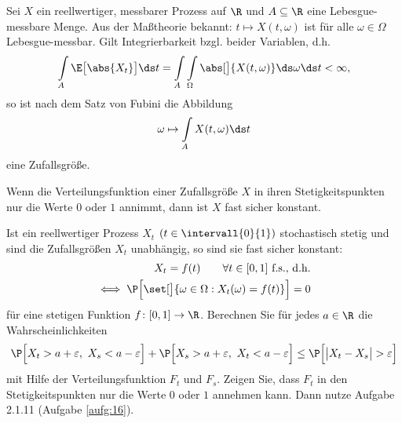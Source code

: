 \begin{bemerkungnr}\label{bemerkung2.1.10}
	Sei $X$ ein reellwertiger, messbarer Prozess auf $\R$ und $A\subseteq\R$ eine Lebesgue-messbare Menge.
	Aus der Maßtheorie bekannt:
	$t\mapsto X(t,\omega)$ ist für alle $\omega\in\Omega$ Lebesgue-messbar.
	Gilt Integrierbarkeit bzgl. beider Variablen, d.h.
	\begin{align*}
		\int\limits_A\E\big[\abs{X_t}\big]\ds t
		=\int\limits_A\int\limits_\Omega\abs[\big]{X(t,\omega)}\ds\omega\ds t<\infty,
	\end{align*}
	so ist nach dem Satz von Fubini die Abbildung
	\begin{align*}
		\omega\mapsto\int\limits_A X(t,\omega)\ds t
	\end{align*}
	eine Zufallsgröße.
\end{bemerkungnr}

\begin{aufgabenr}\label{aufg:16}\enter
	Wenn die Verteilungsfunktion einer Zufallsgröße $X$ in ihren Stetigkeitspunkten nur die Werte $0$ oder $1$ annimmt, dann ist $X$ fast sicher konstant.
\end{aufgabenr}

\begin{aufgabenr}\label{aufg:17}\enter
	Ist ein reellwertiger Prozess $X_t$ $(t\in\intervall{0}{1})$ stochastisch stetig und sind die Zufallsgrößen $X_t$ unabhängig, so sind sie fast sicher konstant:
	\begin{align*}
		X_t=f(t)\qquad\forall t\in[0,1]\text{ f.s., d.h.}\\
		\iff \P\Big[\set[\big]{\omega\in\Omega: X_t(\omega)=f(t)}\Big]=0
	\end{align*}
	für eine stetigen Funktion $f\colon[0,1]\to\R$.\nl
	 Berechnen Sie für jedes $a\in\R$ die Wahrscheinlichkeiten
	\begin{align*}
		\P\Big[ X_t>a+\varepsilon,~X_s<a-\varepsilon\Big]
		+
		\P\Big[ X_s>a+\varepsilon,~X_t<a-\varepsilon\Big]
		\leq
		\P\Big[\big| X_t-X_s\big|>\varepsilon\Big]
	\end{align*}
	mit Hilfe der Verteilungsfunktion $F_t$ und $F_s$.
	Zeigen Sie, dass $F_t$ in den Stetigkeitspunkten nur die Werte $0$ oder $1$ annehmen kann.
	Dann nutze Aufgabe 2.1.11 (Aufgabe \ref{aufg:16}).
\end{aufgabenr}


